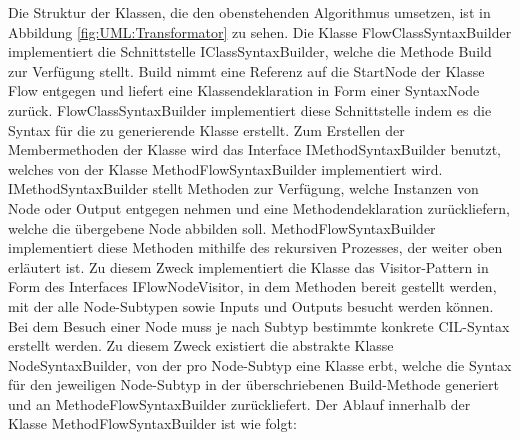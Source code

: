 \newline
Die Struktur der Klassen, die den obenstehenden Algorithmus umsetzen, ist in Abbildung \ref{fig:UML:Transformator} zu sehen. Die Klasse FlowClassSyntaxBuilder implementiert die Schnittstelle IClassSyntaxBuilder, welche die Methode Build zur Verfügung stellt. Build nimmt eine Referenz auf die StartNode der Klasse Flow entgegen und liefert eine Klassendeklaration in Form einer SyntaxNode zurück. FlowClassSyntaxBuilder implementiert diese Schnittstelle indem es die Syntax für die zu generierende Klasse erstellt. Zum Erstellen der Membermethoden der Klasse wird das Interface IMethodSyntaxBuilder benutzt, welches von der Klasse MethodFlowSyntaxBuilder implementiert wird. IMethodSyntaxBuilder stellt Methoden zur Verfügung, welche Instanzen von Node oder Output entgegen nehmen und eine Methodendeklaration zurückliefern, welche die übergebene Node abbilden soll. MethodFlowSyntaxBuilder implementiert diese Methoden mithilfe des rekursiven Prozesses, der weiter oben erläutert ist. Zu diesem Zweck implementiert die Klasse das Visitor-Pattern in Form des Interfaces IFlowNodeVisitor, in dem Methoden bereit gestellt werden, mit der alle Node-Subtypen sowie Inputs und Outputs besucht werden können. Bei dem Besuch einer Node muss je nach Subtyp bestimmte konkrete CIL-Syntax erstellt werden. Zu diesem Zweck existiert die abstrakte Klasse NodeSyntaxBuilder, von der pro Node-Subtyp eine Klasse erbt, welche die Syntax für den jeweiligen Node-Subtyp in der überschriebenen Build-Methode generiert und an MethodeFlowSyntaxBuilder zurückliefert. Der Ablauf innerhalb der Klasse MethodFlowSyntaxBuilder ist wie folgt:
\newline
